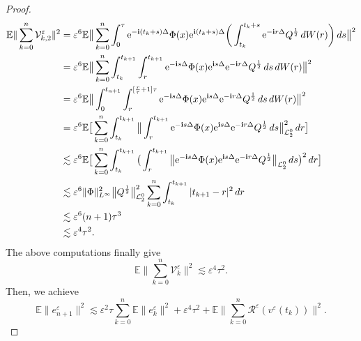 \documentclass[a4paper]{amsart}
\begin{document}
\begin{proof}
\begin{align*}
\mathbb{E}\|\displaystyle\sum_{k=0}^n\mathcal{V}^\varepsilon_{k,2}\|^{2}&=\varepsilon^{6}\mathbb{E}\big\|\displaystyle\sum_{k=0}^{n}\int_{0}^{\tau}{\rm e}^{-{\bf i}(t_k+s)\Delta} \Phi(x){\rm e}^{{\bf i}(t_k+s)\Delta}\bigg(\int_{t_k}^{t_k+s}{\rm e}^{-{\bf i}r \Delta}Q^{\frac{1}{2}}\,dW(r)\bigg)\,ds\big\|^{2}\\
    &=\varepsilon^{6}\mathbb{E}\big\|\displaystyle\sum_{k=0}^{n}\int_{t_k}^{t_{k+1}}\int_{r}^{t_{k+1}}{\rm e}^{-{\bf i}s\Delta} \Phi(x){\rm e}^{{\bf i}s\Delta}{\rm e}^{-{\bf i}r \Delta}Q^{\frac{1}{2}}\,ds\,dW(r)\big\|^{2}\\
     &=\varepsilon^{6}\mathbb{E}\big\|\int_{0}^{t_{n+1}}\int_{r}^{[\frac{r}{\tau}+1]\tau}{\rm e}^{-{\bf i}s\Delta} \Phi(x){\rm e}^{{\bf i}s\Delta}{\rm e}^{-{\bf i}r \Delta}Q^{\frac{1}{2}}\,ds\,dW(r)\big\|^{2}\\
     &=\varepsilon^{6} \mathbb{E}\big[\displaystyle\sum_{k=0}^{n}\int_{t_k}^{t_{k+1}}\big\|\int_{r}^{t_{k+1}}{\rm e}^{-{\bf i}s\Delta} \Phi(x){\rm e}^{{\bf i}s\Delta}{\rm e}^{-{\bf i}r \Delta}Q^{\frac{1}{2}}\,ds\big\|^2_{\mathcal{L}_2^0}\,dr\big]\\
     &\lesssim \varepsilon^{6}\mathbb{E}\big[\displaystyle\sum_{k=0}^{n}\int_{t_k}^{t_{k+1}}\big(\int_{r}^{t_{k+1}}\big\|{\rm e}^{-{\bf i}s\Delta} \Phi(x){\rm e}^{{\bf i}s\Delta}{\rm e}^{-{\bf i}r \Delta}Q^{\frac{1}{2}}\big\|_{\mathcal{L}_2^0}\,ds\big)^2\,dr\big]\\
     &\lesssim \varepsilon^{6}\|\Phi\|^{2}_{L^\infty}\big\|Q^{\frac{1}{2}}\big\|^{2}_{\mathcal{L}_2^0}\displaystyle\sum_{k=0}^{n}\int_{t_{k}}^{t_{k+1}}|t_{k+1}-r|^2\,dr\\
     &\lesssim  \varepsilon^6 (n+1)\tau^3\\
     &\lesssim \varepsilon^4 \tau^2.
\end{align*}
The above computations finally give
$$
\mathbb{E}\|\displaystyle\sum_{k=0}^{n}\mathcal{V}^\varepsilon_k\|^{2}\lesssim \varepsilon^4\tau^2.
$$
Then, we achieve 
\begin{equation}
    \label{fe}
\mathbb{E}\|e^\varepsilon_{n+1}\|^{2}\lesssim\varepsilon^2 \tau \sum_{k=0}^{n}\mathbb{E}\|e^\varepsilon_k\|^{2}+\varepsilon^4 \tau^2 +\mathbb{E}\|\sum_{k=0}^n \mathcal{R}^\varepsilon(v^\varepsilon(t_k))\|^{2}.
\end{equation}

\end{proof}
\end{document}
